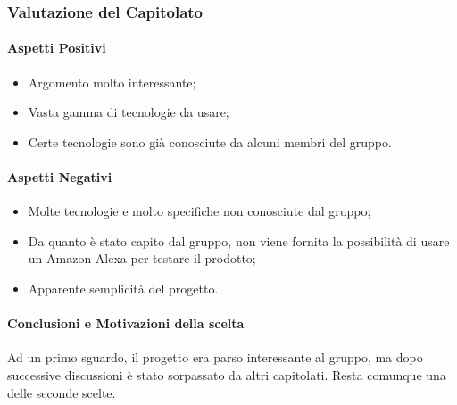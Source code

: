\subsubsection{Valutazione del Capitolato}
\paragraph{Aspetti Positivi}
\begin{itemize}
	\item Argomento molto interessante;
	\item Vasta gamma di tecnologie da usare;
	\item Certe tecnologie sono già conosciute da alcuni membri del gruppo.
\end{itemize}

\paragraph{Aspetti Negativi}
\begin{itemize}
	\item Molte tecnologie e molto specifiche non conosciute dal gruppo;
	\item Da quanto è stato capito dal gruppo, non viene fornita la possibilità di usare un Amazon Alexa per testare il prodotto;
	\item Apparente semplicità del progetto.
\end{itemize}

\paragraph{Conclusioni e Motivazioni della scelta}
Ad un primo sguardo, il progetto era parso interessante al gruppo, ma dopo successive discussioni è stato sorpassato da altri capitolati. Resta comunque una delle seconde scelte.
